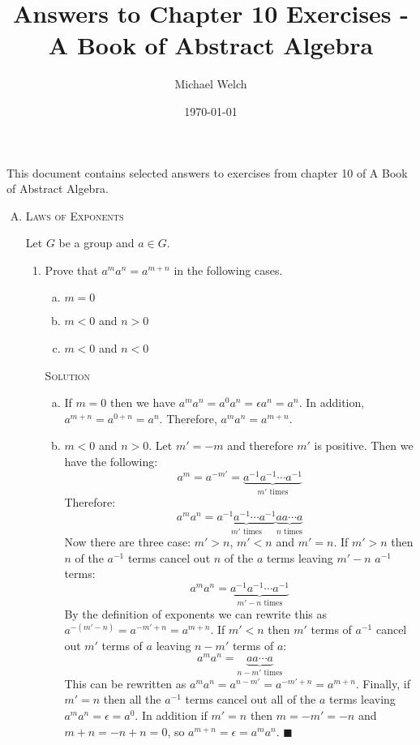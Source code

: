 \documentclass[twoside]{amsart}
\newcommand{\solution}{\textsc{Solution}\xspace}
\newcommand{\blank}{\vspace{5pt}}
\renewcommand{\qed}{\blacksquare}
\begin{document}
\title{Answers to Chapter 10 Exercises - A Book of Abstract Algebra}
\author{Michael Welch}
\date{\today}
\maketitle

This document contains selected answers to exercises from chapter 10
of A Book of Abstract Algebra.


\begin{enumerate}[A.]
   
   \item \textsc{Laws of Exponents}

   Let $G$ be a group and $a \in G$.

   \begin{enumerate}[1]
      \blank
      \item Prove that $a^m a^n = a^{m+n}$ in the following cases.
      \begin{enumerate}[(a)]
         \item $m=0$
         \item $m<0$ and $n>0$
         \item $m<0$ and $n<0$
      \end{enumerate}

      \blank \noindent \solution
      \begin{enumerate}[(a)]
         \item If $m=0$ then we have $a^m a^n = a^0 a^n = \epsilon a^n = a^n$.
         In addition, $a^{m+n} = a^{0+n} = a^n$. Therefore, $a^m a^n = a^{m+n}$.

         \item $m<0$ and $n>0$. 
         Let $m' = -m$ and therefore $m'$ is positive. Then 
         we have the following:
         \[a^m = a^{-m'} = \underbrace{a^{-1}a^{-1}\cdots 
         a^{-1}}_{m'\text{ times}}\] Therefore: \[a^m a^n =
         \underbrace{a^{-1}a^{-1}\cdots a^{-1}}_{m'\text{ times}}
         \underbrace{aa\cdots a}_{n\text{ times}}\] 
         Now there are three case: $m'>n$, $m'<n$ and $m'=n$.
         If $m' > n$
         then $n$ of the $a^{-1}$ terms cancel out $n$ of the $a$
         terms leaving $m'-n$ $a^{-1}$ terms: \[a^m a^n = \underbrace{
         a^{-1} a^{-1} \cdots a^{-1}}_{m'-n\text{ times}}\] By
         the definition of exponents we can rewrite this as
         $a^{-(m'-n)} = a^{-m'+n} = a^{m+n}$. If
         $m' < n$ then $m'$ terms of $a^{-1}$ cancel out
         $m'$ terms of $a$ leaving $n-m'$ terms of $a$:
         \[a^m a^n = \underbrace{a a \cdots a}_{n-m'\text{ times}}\]
         This can be rewritten as $a^m a^n = a^{n-m'} = a^{-m' + n} 
         = a^{m+n}$. Finally, if $m'=n$ then all the $a^{-1}$ terms
         cancel out all of the $a$ terms leaving $a^m a^n = \epsilon
         = a^0$. In addition if $m'=n$ then $m=-m'=-n$ and
         $m+n=-n+n = 0$, so $a^{m+n} = \epsilon = a^ma^n$. $\qed$


\end{enumerate}
\end{enumerate}
\end{enumerate}
\end{document}
